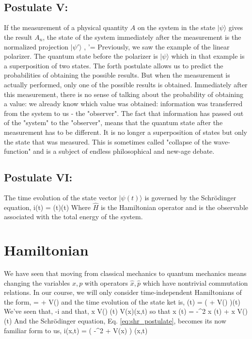 \documentclass{Textbook}
\begin{document}
\subsection{Postulate V:}
If the measurement of a physical quantity $\hat{A}$ on the system in the state $\vert \psi \rangle$ gives the result $A_n$, the state of the system immediately after the measurement is the normalized projection $\vert \psi'\rangle$ ,
\be 
\vert \psi'\rangle = 
\ee
Previously, we saw the example of the linear polarizer. The quantum state before the polarizer is $\vert \psi \rangle$ which in that example is a superposition of two states. The forth postulate allows us to predict the probabilities of obtaining the possible results. But when the measurement is actually performed, only one of the possible results is obtained. Immediately after this measurement, there is no sense of talking about the probability of obtaining a value: we already know which value was obtained: information was transferred from the system to us - the "observer". The fact that information has passed out of the "system" to the "observer", means that the quantum state after the measurement has to be different. It is no longer a superposition of states but only the state that was measured. This is sometimes called "collapse of the wave-function" and is a subject of endless philosophical and new-age debate.
\subsection{Postulate VI:}
The time evolution of the state vector $\vert \psi(t) \rangle$ is governed by the Schr{\"o}dinger equation,
\be
i\hbar {}\vert \psi(t) \rangle = (t)\vert \psi(t) \rangle 
\label{eq:shr_postulate}
\ee
Where $\hat{H}$ is the Hamiltonian operator and is the observable associated with the total energy of the system.
\section{Hamiltonian}
We have seen that moving from classical mechanics to quantum mechanics means changing the variables $x,p$ with operators $\hat{x},\hat{p}$ which have nontrivial commutation relations.
In our course, we will only consider time-independent Hamiltonians of the form,
\be
{} =  + V()
\ee
and the time evolution of the state ket is,
\be
{} \vert \psi(t) \rangle = \left( + V() \right)\vert \psi(t) \rangle
\ee
We've seen that,
\be
{} \rightarrow -i\hbar \vec{\nabla}
\ee
and that,
\be 
\langle x \vert V() \vert \psi(t) \rangle \rightarrow V(x)\psi(x,t)
\ee
so that
\be
\langle x \vert {}\vert \psi(t) \rangle = -\nabla^2 \langle x \vert \psi(t) \rangle + \langle x \vert V() \vert \psi(t) \rangle
\ee
And the Schr{\"o}dinger equation, Eq. \ref{eq:shr_postulate}, becomes its now familiar form to us,
\be 
i\hbar {}\psi(x,t) = \left( -\nabla^2 + V(x) \right) \psi(x,t)
\ee
\end{document}

